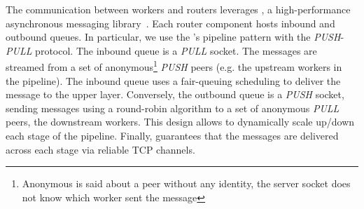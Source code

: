 The communication between workers and routers leverages \zmq, a high-performance asynchronous messaging library~\cite{zero_mq}.
Each router component hosts inbound and outbound queues. %
In particular, we use the \zmq's pipeline pattern with the \emph{PUSH}-\emph{PULL} protocol\cite{zero_mq:pipeline}.
The inbound queue is a \emph{PULL} socket.
The messages are streamed from a set of anonymous\footnote{Anonymous is said about a peer without any identity, the server socket does not know which worker sent the message} \emph{PUSH} peers (e.g. the upstream workers in the pipeline).
The inbound queue uses a fair-queuing scheduling to deliver the message to the upper layer.%
Conversely, the outbound queue is a \emph{PUSH} socket, sending messages using a round-robin algorithm to a set of anonymous \emph{PULL} peers, the downstream workers.
This design allows to dynamically scale up/down each stage of the pipeline. %
Finally, \zmq guarantees that the messages are delivered across each stage via reliable TCP channels.


